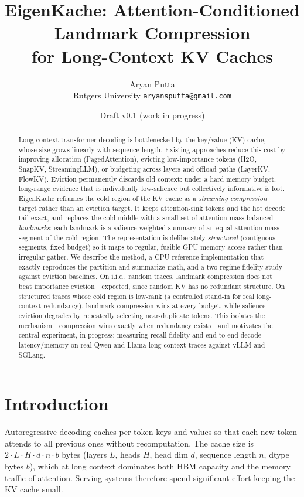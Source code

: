 \documentclass[10pt,twocolumn]{article}
\title{\vspace{-3.5em}\textbf{EigenKache: Attention-Conditioned Landmark Compression\\ for Long-Context KV Caches}}
\author{Aryan Putta\\ \small Rutgers University \quad \texttt{aryansputta@gmail.com}}
\date{\small Draft v0.1 (work in progress)}
\begin{document}
\maketitle

\begin{abstract}
\noindent
Long-context transformer decoding is bottlenecked by the key/value (KV) cache,
whose size grows linearly with sequence length. Existing approaches reduce this
cost by improving allocation (PagedAttention), evicting low-importance tokens
(H2O, SnapKV, StreamingLLM), or budgeting across layers and offload paths
(LayerKV, FlowKV). Eviction permanently discards old context: under a hard
memory budget, long-range evidence that is individually low-salience but
collectively informative is lost. EigenKache reframes the cold region of the KV
cache as a \emph{streaming compression} target rather than an eviction target.
It keeps attention-sink tokens and the hot decode tail exact, and replaces the
cold middle with a small set of attention-mass-balanced \emph{landmarks}: each
landmark is a salience-weighted summary of an equal-attention-mass segment of
the cold region. The representation is deliberately \emph{structured}
(contiguous segments, fixed budget) so it maps to regular, fusible GPU memory
access rather than irregular gather. We describe the method, a CPU reference
implementation that exactly reproduces the partition-and-summarize math, and a
two-regime fidelity study against eviction baselines. On i.i.d.\ random traces,
landmark compression does not beat importance eviction---expected, since random
KV has no redundant structure. On structured traces whose cold region is
low-rank (a controlled stand-in for real long-context redundancy), landmark
compression wins at every budget, while salience eviction degrades by repeatedly
selecting near-duplicate tokens. This isolates the mechanism---compression wins
exactly when redundancy exists---and motivates the central experiment, in
progress: measuring recall fidelity and end-to-end decode latency/memory on real
Qwen and Llama long-context traces against vLLM and SGLang.
\end{abstract}

\section{Introduction}
Autoregressive decoding caches per-token keys and values so that each new token
attends to all previous ones without recomputation. The cache size is
$2 \cdot L \cdot H \cdot d \cdot n \cdot b$ bytes (layers $L$, heads $H$, head
dim $d$, sequence length $n$, dtype bytes $b$), which at long context dominates
both HBM capacity and the memory traffic of attention. Serving systems therefore
spend significant effort keeping the KV cache small.
\end{document}
